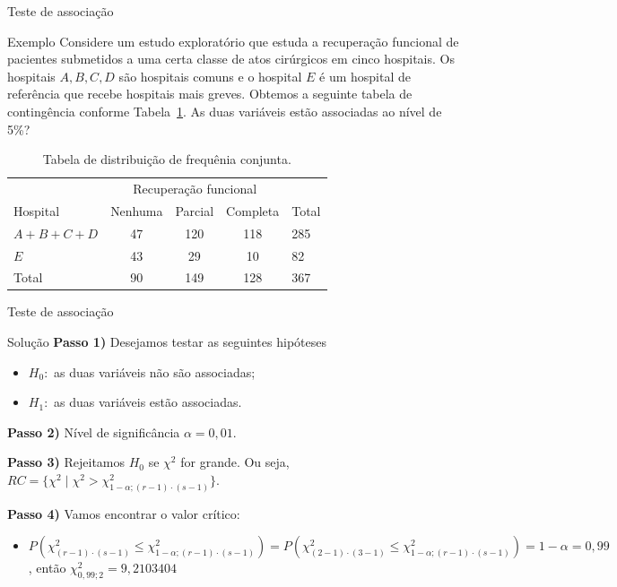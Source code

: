 \documentclass[9pt]{beamer}
\begin{document}
\begin{frame}{Teste de associação}

\begin{block}{Exemplo}
Considere um estudo exploratório que estuda a recuperação funcional de pacientes submetidos a uma certa classe de atos cirúrgicos em cinco hospitais. Os hospitais $A, B, C, D$ são hospitais comuns e o hospital $E$ é um hospital de referência que recebe hospitais mais greves. Obtemos a seguinte tabela de contingência conforme Tabela~\ref{tab:independencia}. As duas variáveis estão associadas ao nível de 5\%?
\begin{table}[htbp]
	\centering
	\caption{Tabela de distribuição de frequênia conjunta.}
	\label{tab:independencia}
	\begin{tabular}{l|ccc|l}
		\toprule[0.05cm]
		& \multicolumn{3}{|c|}{Recuperação funcional} & \\ \cmidrule[0.05cm]{2-4}
		Hospital & Nenhuma & Parcial & Completa & Total \\ \midrule[0.05cm]
		$A+B+C+D$ & 47 & 120 & 118 & 285\\
		$E$ & 43 & 29 & 10 & 82 \\ \midrule[0.05cm]
		Total & 90 & 149 & 128 & 367\\ \bottomrule[0.05cm]
	\end{tabular}
\end{table}	
\end{block}

\end{frame}


\begin{frame}{Teste de associação}

\normalsize
\begin{block}{Solução}
	{\bf Passo 1)} Desejamos testar as seguintes hipóteses
	\begin{itemize}
		\item $H_0:$ as duas variáveis não são associadas;
		\item $H_1:$ as duas variáveis estão associadas.
	\end{itemize}
	\vfill
	
	{\bf Passo 2)} Nível de significância $\alpha = 0,01.$
	\vfill
	
	{\bf Passo 3)} Rejeitamos $H_0$ se $\chi^2$ for grande. Ou seja,
	$RC = \{ \chi^2 \mid \chi^2 > \chi^2_{1-\alpha;(r-1)\cdot (s-1)} \}.$
	\vfill
	
	{\bf Passo 4)} Vamos encontrar o valor crítico:
	\begin{itemize}
		\item $P\left( \chi_{(r-1)\cdot (s-1)}^2 \leq \chi^2_{1-\alpha;(r-1)\cdot (s-1)} \right) =  P\left( \chi_{(2-1)\cdot (3-1)}^2 \leq \chi^2_{1-\alpha;(r-1)\cdot (s-1)} \right) = \allowbreak 1 -\alpha = 0,99$, então $\chi^2_{0,99;2} = 9,2103404 $
	\end{itemize}

\end{block}
\normalsize

\end{frame}
\end{document}
